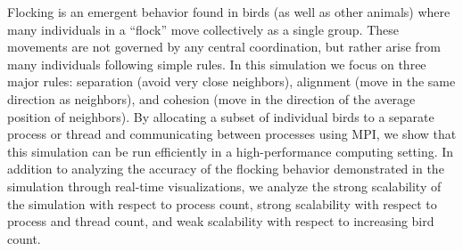 Flocking is an emergent behavior found in birds (as well as other
animals) where many individuals in a “flock” move collectively as a
single group. These movements are not governed by any central
coordination, but rather arise from many individuals following simple
rules. In this simulation we focus on three major rules: separation
(avoid very close neighbors), alignment (move in the same direction as
neighbors), and cohesion (move in the direction of the average
position of neighbors). By allocating a subset of individual birds to
a separate process or thread and communicating between processes using
MPI, we show that this simulation can be run efficiently in a
high-performance computing setting. In addition to analyzing the
accuracy of the flocking behavior demonstrated in the simulation
through real-time visualizations, we analyze the strong scalability of
the simulation with respect to process count, strong scalability with
respect to process and thread count, and weak scalability with respect to
increasing bird count.
